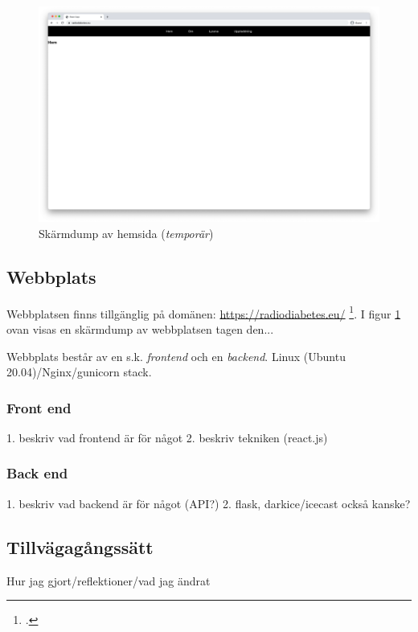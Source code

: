 \documentclass[11pt, a4paper]{article} %
\begin{document}
\begin{figure}[ht!]
\centering
\includegraphics[width=\textwidth]{../media/hemsida.png}
\caption{Skärmdump av hemsida (\emph{temporär})}
\label{hemsida}
\end{figure}

\subsection*{Webbplats}

Webbplatsen finns tillgänglig på domänen: \url{https://radiodiabetes.eu/} \footcite{jondell_radio_nodate}. I figur \ref{hemsida} ovan visas en skärmdump av webbplatsen tagen den... %

Webbplats består av en s.k. \emph{\gls{frontend}} och en \emph{\gls{backend}}. Linux (Ubuntu 20.04)/Nginx/gunicorn \gls{stack}.
\subsubsection*{Front end}
1. beskriv vad frontend är för något
2. beskriv tekniken (react.js)

\subsubsection*{Back end}
1. beskriv vad backend är för något (API?)
2. flask, darkice/icecast också kanske? 

\subsection*{Tillvägagångssätt}
Hur jag gjort/reflektioner/vad jag ändrat
\end{document}
